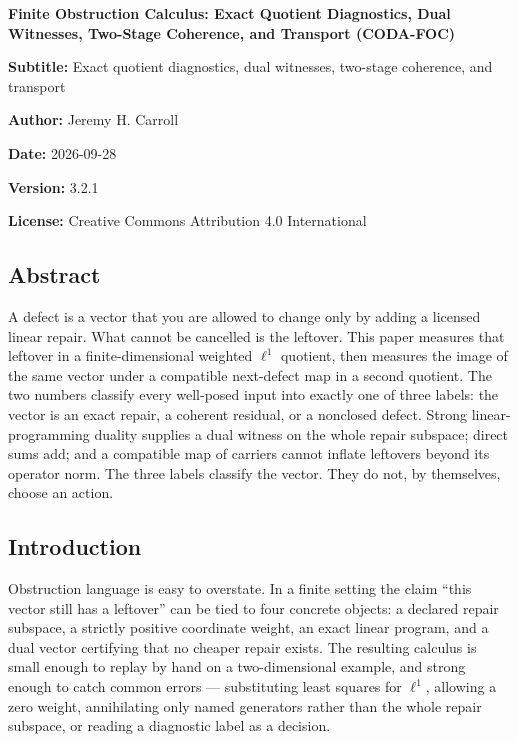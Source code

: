 \documentclass[
  11pt,
]{article}
\begin{document}
\begin{center}
{\Large\bfseries Finite Obstruction Calculus: Exact Quotient Diagnostics, Dual Witnesses, Two-Stage Coherence, and Transport (CODA-FOC)}\par
\textbf{Subtitle:} Exact quotient diagnostics, dual witnesses, two-stage coherence, and transport

\textbf{Author:} Jeremy H. Carroll

\textbf{Date:} 2026-09-28

\textbf{Version:} 3.2.1

\textbf{License:} Creative Commons Attribution 4.0 International

\end{center}

\subsection{Abstract}\label{abstract}

A defect is a vector that you are allowed to change only by adding a licensed linear repair. What cannot be cancelled is the leftover. This paper measures that leftover in a finite-dimensional weighted \(\ell^1\) quotient, then measures the image of the same vector under a compatible next-defect map in a second quotient. The two numbers classify every well-posed input into exactly one of three labels: the vector is an exact repair, a coherent residual, or a nonclosed defect. Strong linear-programming duality supplies a dual witness on the whole repair subspace; direct sums add; and a compatible map of carriers cannot inflate leftovers beyond its operator norm. The three labels classify the vector. They do not, by themselves, choose an action.

\subsection{Introduction}\label{introduction}

Obstruction language is easy to overstate. In a finite setting the claim ``this vector still has a leftover'' can be tied to four concrete objects: a declared repair subspace, a strictly positive coordinate weight, an exact linear program, and a dual vector certifying that no cheaper repair exists. The resulting calculus is small enough to replay by hand on a two-dimensional example, and strong enough to catch common errors --- substituting least squares for \(\ell^1\), allowing a zero weight, annihilating only named generators rather than the whole repair subspace, or reading a diagnostic label as a decision.
\end{document}
